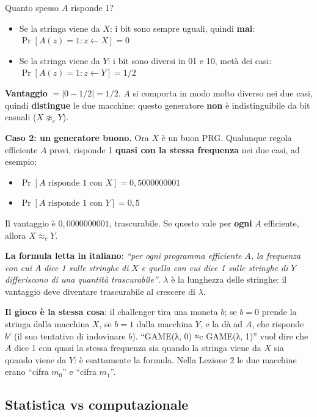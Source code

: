 Quanto spesso \(A\) risponde 1?

\begin{itemize}
\tightlist
\item
  Se la stringa viene da \(X\): i bit sono sempre uguali, quindi \textbf{mai}: \(\Pr[A(z) = 1 : z \leftarrow X] = 0\)
\item
  Se la stringa viene da \(Y\): i bit sono diversi in 01 e 10, metà dei casi: \(\Pr[A(z) = 1 : z \leftarrow Y] = 1/2\)
\end{itemize}

\textbf{Vantaggio} \(= |0 - 1/2| = 1/2\). \(A\) si comporta in modo molto diverso nei due casi, quindi \textbf{distingue} le due macchine: questo generatore \textbf{non} è indistinguibile da bit casuali (\(X \not\approx_c Y\)).

\textbf{Caso 2: un generatore buono.} Ora \(X\) è un buon PRG. Qualunque regola efficiente \(A\) provi, risponde 1 \textbf{quasi con la stessa frequenza} nei due casi, ad esempio:

\begin{itemize}
\tightlist
\item
  \(\Pr[A \text{ risponde } 1 \text{ con } X] = 0{,}5000000001\)
\item
  \(\Pr[A \text{ risponde } 1 \text{ con } Y] = 0{,}5\)
\end{itemize}

Il vantaggio è \(0{,}0000000001\), trascurabile. Se questo vale per \textbf{ogni} \(A\) efficiente, allora \(X \approx_c Y\).

\textbf{La formula letta in italiano}: \emph{``per ogni programma efficiente} \(A\)\emph{, la frequenza con cui} \(A\) \emph{dice 1 sulle stringhe di} \(X\) \emph{e quella con cui dice 1 sulle stringhe di} \(Y\) \emph{differiscono di una quantità trascurabile''}. \(\lambda\) è la lunghezza delle stringhe: il vantaggio deve diventare trascurabile al crescere di \(\lambda\).

\textbf{Il gioco è la stessa cosa}: il challenger tira una moneta \(b\); se \(b = 0\) prende la stringa dalla macchina \(X\), se \(b = 1\) dalla macchina \(Y\), e la dà ad \(A\), che risponde \(b'\) (il suo tentativo di indovinare \(b\)). ``GAME(λ, 0) ≈c GAME(λ, 1)'' vuol dire che \(A\) dice 1 con quasi la stessa frequenza sia quando la stringa viene da \(X\) sia quando viene da \(Y\): è esattamente la formula. Nella Lezione 2 le due macchine erano ``cifra \(m_0\)'' e ``cifra \(m_1\)''.

\subsection{Statistica vs computazionale}

